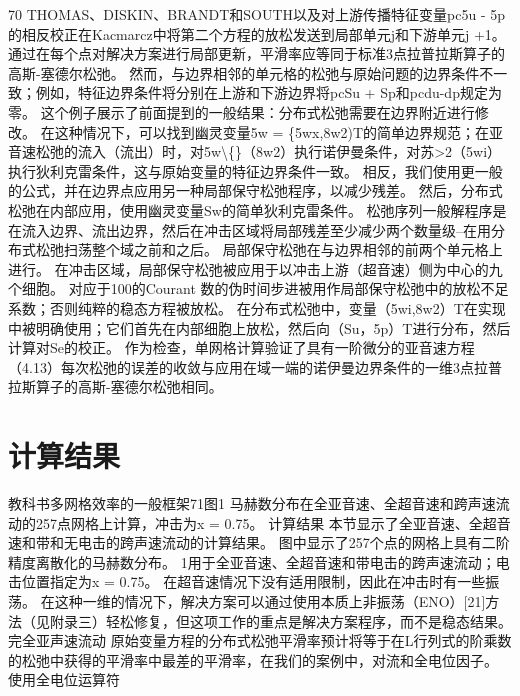 \documentclass[UTF8,11pt,a4paper,openany,fontset=fandol]{ctexbook}
\begin{document}
70 THOMAS、DISKIN、BRANDT和SOUTH以及对上游传播特征变量pc5u - 5p的相反校正在Kacmarcz中将第二个方程的放松发送到局部单元j和下游单元j +1。 通过在每个点对解决方案进行局部更新，平滑率应等同于标准3点拉普拉斯算子的高斯-塞德尔松弛。 然而，与边界相邻的单元格的松弛与原始问题的边界条件不一致；例如，特征边界条件将分别在上游和下游边界将pcSu + Sp和pcdu-dp规定为零。 这个例子展示了前面提到的一般结果：分布式松弛需要在边界附近进行修改。 在这种情况下，可以找到幽灵变量5w = \{5wx,8w2)T的简单边界规范；在亚音速松弛的流入（流出）时，对5w\textbackslash\{\}（8w2）执行诺伊曼条件，对苏>2（5wi）执行狄利克雷条件，这与原始变量的特征边界条件一致。 相反，我们使用更一般的公式，并在边界点应用另一种局部保守松弛程序，以减少残差。 然后，分布式松弛在内部应用，使用幽灵变量Sw的简单狄利克雷条件。 松弛序列一般解程序是在流入边界、流出边界，然后在冲击区域将局部残差至少减少两个数量级--在用分布式松弛扫荡整个域之前和之后。 局部保守松弛在与边界相邻的前两个单元格上进行。 在冲击区域，局部保守松弛被应用于以冲击上游（超音速）侧为中心的九个细胞。 对应于100的Courant 数的伪时间步进被用作局部保守松弛中的放松不足系数；否则纯粹的稳态方程被放松。 在分布式松弛中，变量（5wi,8w2）T在实现中被明确使用；它们首先在内部细胞上放松，然后向（Su，5p）T进行分布，然后计算对Se的校正。 作为检查，单网格计算验证了具有一阶微分的亚音速方程（4.13）每次松弛的误差的收敛与应用在域一端的诺伊曼边界条件的一维3点拉普拉斯算子的高斯-塞德尔松弛相同。

\section{计算结果}
教科书多网格效率的一般框架71图1 马赫数分布在全亚音速、全超音速和跨声速流动的257点网格上计算，冲击为x = 0.75。 计算结果 本节显示了全亚音速、全超音速和带和无电击的跨声速流动的计算结果。 图中显示了257个点的网格上具有二阶精度离散化的马赫数分布。 1用于全亚音速、全超音速和带电击的跨声速流动；电击位置指定为x = 0.75。 在超音速情况下没有适用限制，因此在冲击时有一些振荡。 在这种一维的情况下，解决方案可以通过使用本质上非振荡（ENO）[21]方法（见附录三）轻松修复，但这项工作的重点是解决方案程序，而不是稳态结果。 完全亚声速流动 原始变量方程的分布式松弛平滑率预计将等于在L行列式的阶乘数的松弛中获得的平滑率中最差的平滑率，在我们的案例中，对流和全电位因子。 使用全电位运算符
\end{document}
